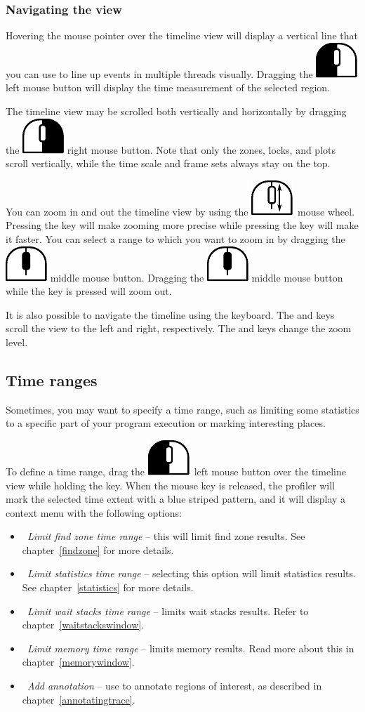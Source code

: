 \documentclass[hidelinks,titlepage,a4paper]{article}
\newcommand{\LMB}{\includegraphics[height=.8\baselineskip]{icons/lmb}}
\newcommand{\RMB}{\includegraphics[height=.8\baselineskip]{icons/rmb}}
\newcommand{\MMB}{\includegraphics[height=.8\baselineskip]{icons/mmb}}
\newcommand{\Scroll}{\includegraphics[height=.8\baselineskip]{icons/scroll}}
\begin{document}
\subsubsection{Navigating the view}

Hovering the \faMousePointer{} mouse pointer over the timeline view will display a vertical line that you can use to line up events in multiple threads visually. Dragging the \LMB{} left mouse button will display the time measurement of the selected region.

The timeline view may be scrolled both vertically and horizontally by dragging the \RMB{} right mouse button. Note that only the zones, locks, and plots scroll vertically, while the time scale and frame sets always stay on the top.

You can zoom in and out the timeline view by using the \Scroll{}~mouse wheel. Pressing the \keys{\ctrl} key will make zooming more precise while pressing the \keys{\shift} key will make it faster. You can select a range to which you want to zoom in by dragging the \MMB{} middle mouse button. Dragging the \MMB{} middle mouse button while the \keys{\ctrl} key is pressed will zoom out.

It is also possible to navigate the timeline using the keyboard. The  and  keys scroll the view to the left and right, respectively. The  and  keys change the zoom level.

\subsection{Time ranges}
\label{timeranges}

Sometimes, you may want to specify a time range, such as limiting some statistics to a specific part of your program execution or marking interesting places.

To define a time range, drag the \LMB{}~left mouse button over the timeline view while holding the \keys{\ctrl} key. When the mouse key is released, the profiler will mark the selected time extent with a blue striped pattern, and it will display a context menu with the following options:

\begin{itemize}
\item \emph{\faSearch{}~Limit find zone time range} -- this will limit find zone results. See chapter~\ref{findzone} for more details.
\item \emph{\faSortAmountUp{}~Limit statistics time range} -- selecting this option will limit statistics results. See chapter~\ref{statistics} for more details.
\item \emph{\faHourglassHalf{}~Limit wait stacks time range} -- limits wait stacks results. Refer to chapter~\ref{waitstackswindow}.
\item \emph{\faMemory{}~Limit memory time range} -- limits memory results. Read more about this in chapter~\ref{memorywindow}.
\item \emph{\faStickyNote{}~Add annotation} -- use to annotate regions of interest, as described in chapter~\ref{annotatingtrace}.
\end{itemize}
\end{document}

